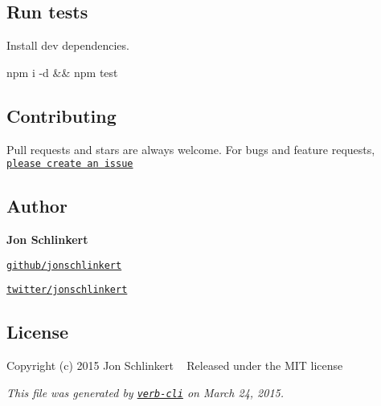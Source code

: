\subsection*{Run tests}

Install dev dependencies.


\begin{DoxyCode}
npm i -d && npm test
\end{DoxyCode}


\subsection*{Contributing}

Pull requests and stars are always welcome. For bugs and feature requests, \href{https://github.com/jonschlinkert/array-unique/issues}{\tt please create an issue}

\subsection*{Author}

{\bfseries Jon Schlinkert}


\begin{DoxyItemize}
\item \href{https://github.com/jonschlinkert}{\tt github/jonschlinkert}
\item \href{http://twitter.com/jonschlinkert}{\tt twitter/jonschlinkert}
\end{DoxyItemize}

\subsection*{License}

Copyright (c) 2015 Jon Schlinkert ~\newline
Released under the M\+IT license





{\itshape This file was generated by \href{https://github.com/assemble/verb-cli}{\tt verb-\/cli} on March 24, 2015.} 